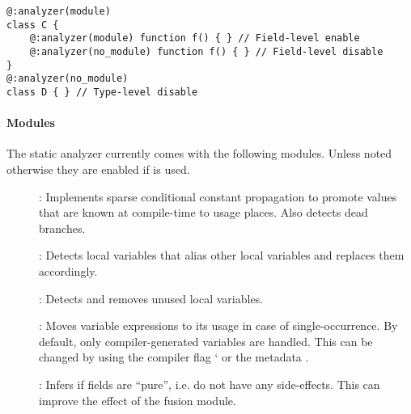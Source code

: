 \begin{lstlisting}
@:analyzer(module)
class C {
	@:analyzer(module) function f() { } // Field-level enable
	@:analyzer(no_module) function f() { } // Field-level disable
}
@:analyzer(no_module)
class D { } // Type-level disable
\end{lstlisting}

\paragraph{Modules}
\label{cr-static-analyzer-modules}

The static analyzer currently comes with the following modules. Unless noted otherwise they are enabled if  is used.

\begin{description}
\item[]: Implements sparse conditional constant propagation to promote values that are known at compile-time to usage places. Also detects dead branches.
\item[]: Detects local variables that alias other local variables and replaces them accordingly.
\item[]: Detects and removes unused local variables.
\item[]: Moves variable expressions to its usage in case of single-occurrence. By default, only compiler-generated variables are handled. This can be changed by using the compiler flag ` or the metadata .
\item[]: Infers if fields are ``pure'', i.e. do not have any side-effects. This can improve the effect of the fusion module.
\end{description}
